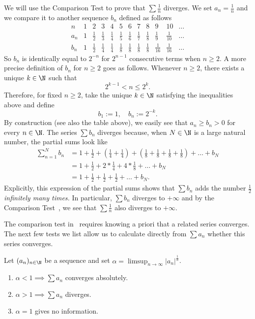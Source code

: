 \begin{eg}
	\label{eg:harmseries}
	We will use the Comparison Test to prove that $\sum \frac{1}{n}$ diverges. We set $a_n = \frac{1}{n}$ and we compare it to another sequence $b_n$ defined as follows
	\[
	\begin{array}{c|c|c|c|c|c|c|c|c|c|c|c}
		n &1	&2	&3	&4	&5	&6	&7	&8	&9	&10 &\dots	\\\hline
		a_n 	&1	&\frac{1}{2}	&\frac{1}{3}	&\frac{1}{4}	&\frac{1}{5}	&\frac{1}{6}	&\frac{1}{7}	&\frac{1}{8}	&\frac{1}{9}	&\frac{1}{10}  	&\dots	\\\hline
		b_n 	&1	&\frac{1}{2} 	&\frac{1}{4}	&\frac{1}{4}	&\frac{1}{8}	&\frac{1}{8} 	&\frac{1}{8} 	&\frac{1}{8} 	&\frac{1}{16} 	&\frac{1}{16} 	&\dots
	\end{array}
	\]
	So $b_n$ is identically equal to $2^{-n}$ for $2^{n-1}$ consecutive terms when $n\ge 2$. A more precise definition of $b_n$ for $n\ge 2$ goes as follows. Whenever $n\ge 2$, there exists a unique $k\in\N$ such that
	\[
	2^{k-1} < n \le 2^k.
	\]
	Therefore, for fixed $n\ge 2$, take the unique $k\in \N$ satisfying the inequalities above and define 
	\[
	b_1 := 1, \quad b_n := 2^{-k}.
	\]
	By construction (see also the table above), we easily see that $a_n \ge b_n >0$ for every $n\in\N$. The series $\sum b_n$ diverges because, when $N\in\N$ is a large natural number, the partial sums look like
	\begin{align*}
		\sum_{n=1}^N b_n &= 1 + \frac{1}{2} + \left(\frac{1}{4} + \frac{1}{4}\right) + \left(\frac{1}{8}+ \frac{1}{8}+ \frac{1}{8}+ \frac{1}{8}\right) + \dots + b_N 	\\
		&= 1 + \frac{1}{2} + 2*\frac{1}{4} + 4*\frac{1}{8} + \dots + b_N 	\\
		&= 1 + \frac{1}{2} + \frac{1}{2} + \frac{1}{2} + \dots + b_N.
	\end{align*}
	Explicitly, this expression of the partial sums shows that $\sum b_n$ adds the number $\frac{1}{2}$ \textit{infinitely many times.} In particular, $\sum b_n$ diverges to $+\infty$ and by the Comparison Test~, we see that $\sum \frac{1}{n}$ also diverges to $+\infty$.
\end{eg}
The comparison test in~ requires knowing a priori that a related series converges. The next few tests we list allow us to calculate directly from $\sum a_n$ whether this series converges.
\begin{thm}
	\label{thm:rootttest}
	Let $(a_n)_{n\in\N}$ be a sequence and set $\alpha = \limsup_{n\to\infty} |a_n|^\frac{1}{n}$.
	\begin{enumerate}[label=\textbf{Root \arabic*)}]
		\item $\alpha <1 \implies \sum a_n$ converges absolutely.
		\item $\alpha >1 \implies \sum a_n$ diverges.
		\item $\alpha =1$ gives no information.
	\end{enumerate}
\end{thm}
